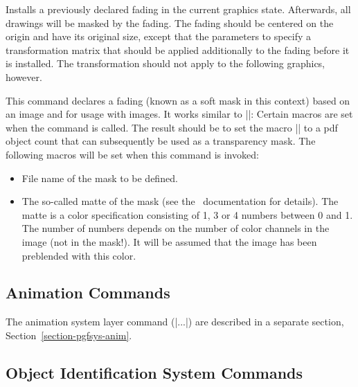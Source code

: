 \begin{command}{\pgfsys@usefading{}}
    Installs a previously declared fading  in the current graphics
    state. Afterwards, all drawings will be masked by the fading. The fading
    should be centered on the origin and have its original size, except that
    the parameters  to  specify a transformation matrix that
    should be applied additionally to the fading before it is installed. The
    transformation should not apply to the following graphics, however.
\end{command}

\begin{command}{\pgfsys@definemask}
    This command declares a fading (known as a soft mask in this context) based
    on an image and for usage with images. It works similar to
    |\pgfsys@defineimage|: Certain macros are set when the command is called.
    The result should be to set the macro |\pgf@mask| to a pdf object count
    that can subsequently be used as a transparency mask. The following macros
    will be set when this command is invoked:
    \begin{itemize}
        \item \declare{|\pgf@filename|}
            File name of the mask to be defined.
        \item \declare{|\pgf@maskmatte|}
            The so-called matte of the mask (see the \pdf\ documentation for
            details). The matte is a color specification consisting of 1, 3 or
            4 numbers between 0 and 1. The number of numbers depends on the
            number of color channels in the image (not in the mask!). It will
            be assumed that the image has been preblended with this color.
    \end{itemize}
\end{command}


\subsection{Animation Commands}

The animation system layer command (|\pgfsys@anim...|) are described in a
separate section, Section~\ref{section-pgfsys-anim}.


\subsection{Object Identification System Commands}
\label{section-sys-id}

